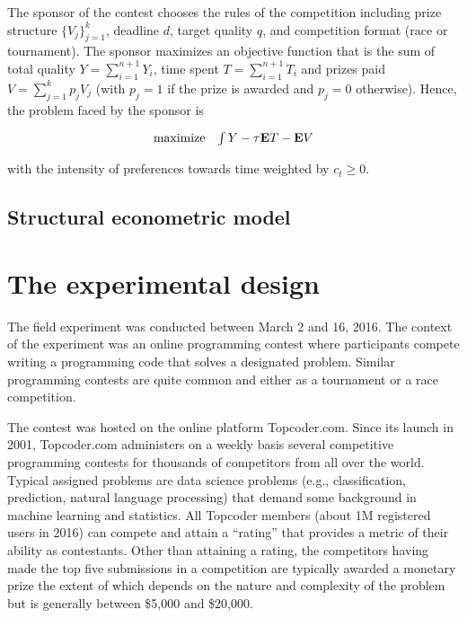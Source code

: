 \documentclass[12pt,]{article}
\begin{document}
The sponsor of the contest chooses the rules of the competition
including prize structure \(\{V_j\}_{j=1}^k\), deadline \(d\), target
quality \(q\), and competition format (race or tournament). The sponsor
maximizes an objective function that is the sum of total quality
\(Y=\sum_{i=1}^{n+1} Y_i\), time spent \(T=\sum_{i=1}^{n+1} T_i\) and
prizes paid \(V=\sum_{j=1}^k p_{j} V_j\) (with \(p_j=1\) if the prize is
awarded and \(p_j=0\) otherwise). Hence, the problem faced by the
sponsor is

\[\begin{array}{ll}
    \mbox{maximize} & \int {Y}   -  {\tau}{{\bf E}}{T} - {{\bf E}}{V}
  \end{array}\]

with the intensity of preferences towards time weighted by
\(c_t\geq 0\).

\subsection{Structural econometric
model}\label{structural-econometric-model}

\section{The experimental design}\label{the-experimental-design}

The field experiment was conducted between March 2 and 16, 2016. The
context of the experiment was an online programming contest where
participants compete writing a programming code that solves a designated
problem. Similar programming contests are quite common and either as a
tournament or a race competition.

The contest was hosted on the online platform Topcoder.com. Since its
launch in 2001, Topcoder.com administers on a weekly basis several
competitive programming contests for thousands of competitors from all
over the world. Typical assigned problems are data science problems
(e.g., classification, prediction, natural language processing) that
demand some background in machine learning and statistics. All Topcoder
members (about 1M registered users in 2016) can compete and attain a
``rating'' that provides a metric of their ability as contestants. Other
than attaining a rating, the competitors having made the top five
submissions in a competition are typically awarded a monetary prize the
extent of which depends on the nature and complexity of the problem but
is generally between \$5,000 and \$20,000.
\end{document}
